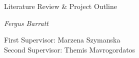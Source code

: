 \begin{titlepage}
    \begin{center}
        \vspace*{1cm}
        
        \huge Literature Review \& Project Outline
        
        \vspace{1.5cm}
        \normalsize
        \emph{Fergus Barratt}
        
        \vfill
        \large
        First Supervisor: Marzena Szymanska\\
        Second Supervisor: Themis Mavrogordatos
        
    \end{center}
\end{titlepage}